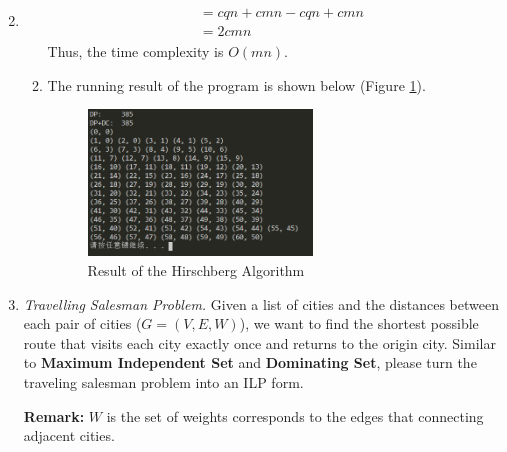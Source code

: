 \documentclass[12pt,a4paper]{article}
\makeatletter
\newtheorem*{solution}{Solution}
\theoremstyle{definition}
\renewenvironment{solution}[1][Solution] {\par\pushQED{\qed}\normalfont\topsep6\p@\@plus6\p@\relax\trivlist\item[\hskip\labelsep\bfseries#1\@addpunct{.}]\ignorespaces}{\popQED\endtrivlist\@endpefalse} \makeatother
\makeatother
\begin{document}
\begin{enumerate}
\begin{solution}
\begin{enumerate}
\begin{align*}
\begin{split}
            &= cqn+cmn-cqn+cmn\\
            &= 2 cmn
        \end{split}
        \end{align*}
        Thus, the time complexity is $O(mn)$.
        \item
        The running result of the program is shown below (Figure \ref{Fig-HirschbergAlgorithm}).
        \begin{figure}[htbp]
                \centering \includegraphics[width=0.6\textwidth]{Fig-HirschbergResult.png}
                \caption{Result of the Hirschberg Algorithm}\label{Fig-HirschbergAlgorithm}
        \end{figure}
    \end{enumerate}
    \end{solution}
    
    \item 
    \textit{Travelling Salesman Problem.} Given a list of cities and the distances between each pair of cities ($ G=(V,E,W) $), we want to find the shortest possible route that visits each city exactly once and returns to the origin city. Similar to \textbf{Maximum Independent Set} and \textbf{Dominating Set}, please turn the traveling salesman problem into an ILP form.  
    
    \textbf{Remark:} $ W $ is the set of weights corresponds to the edges that connecting adjacent cities.  
    

\end{enumerate}
\end{document}
